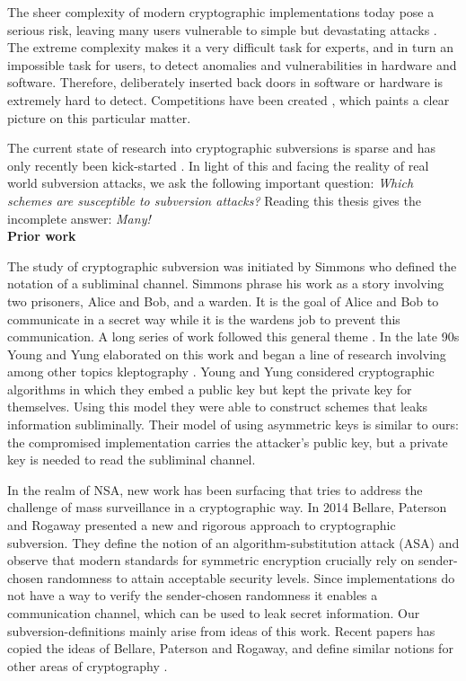 The sheer complexity of modern cryptographic implementations today pose a serious risk, leaving many users vulnerable to simple but devastating attacks \cite{LHA,CVE1,CVE2,CVE3}. The extreme complexity makes it a very difficult task for experts, and in turn an impossible task for users, to detect anomalies and vulnerabilities in hardware and software. Therefore, deliberately inserted back doors in software or hardware is extremely hard to detect. Competitions have been created \cite{UCC}, which paints a clear picture on this particular matter. 

The current state of research into cryptographic subversions is sparse and has only recently been kick-started \cite{DBLP:secSym}. In light of this and facing the reality of real world subversion attacks, we ask the following important question: \emph{Which schemes are susceptible to subversion attacks?} Reading this thesis gives the incomplete answer: \emph{Many!} \\

\noindent\textbf{Prior work} 

The study of cryptographic subversion was initiated by Simmons \cite{sim85, sim94} who defined the notation of a subliminal channel. Simmons phrase his work as a story involving two prisoners, Alice and Bob, and a warden. It is the goal of Alice and Bob to communicate in a secret way while it is the wardens job to prevent this communication. A long series of work followed this general theme \cite{DBLP:conf/crypto/Desmedt88,DBLP:conf/ih/BurmesterDISSY96,DBLP:conf/eurocrypt/BlazeBS98,BD91}. In the late 90s Young and Yung elaborated on this work and began a line of research involving among other topics kleptography \cite{DBLP:conf/crypto/YoungY96,DBLP:conf/eurocrypt/YoungY97,DBLP:conf/ches/YoungY01,DBLP:conf/crypto/YoungY97}. Young and Yung considered cryptographic algorithms in which they embed a public key but kept the private key for themselves. Using this model they were able to construct schemes that leaks information subliminally. Their model of using asymmetric keys is similar to ours: the compromised implementation carries the attacker's public key, but a private key is needed to read the subliminal channel. 

In the realm of NSA, new work has been surfacing that tries to address the challenge of mass surveillance in a cryptographic way. In 2014 Bellare, Paterson and Rogaway \cite{DBLP:secSym} presented a new and rigorous approach to cryptographic subversion. They define the notion of an algorithm-substitution attack (ASA) and observe that modern standards for symmetric encryption crucially rely on sender-chosen randomness to attain acceptable security levels. Since implementations do not have a way to verify the sender-chosen randomness it enables a communication channel, which can be used to leak secret information. Our subversion-definitions mainly arise from ideas of this work. Recent papers has copied the ideas of Bellare, Paterson and Rogaway, and define similar notions for other areas of cryptography \cite{cryptoeprint:2015:683,cryptoeprint:2015:517,DBLP:conf/eurocrypt/DodisGGJR15}. \\

